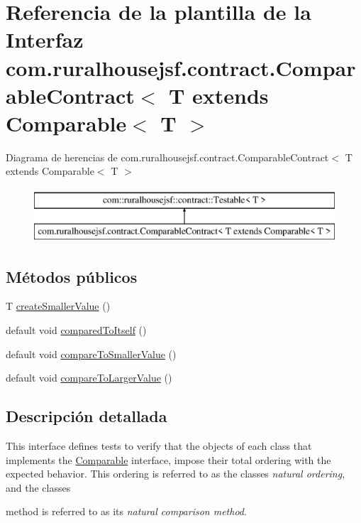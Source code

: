 \hypertarget{interfacecom_1_1ruralhousejsf_1_1contract_1_1_comparable_contract}{}\section{Referencia de la plantilla de la Interfaz com.\+ruralhousejsf.\+contract.\+Comparable\+Contract$<$ T extends Comparable$<$ T $>$}
\label{interfacecom_1_1ruralhousejsf_1_1contract_1_1_comparable_contract}
Diagrama de herencias de com.\+ruralhousejsf.\+contract.\+Comparable\+Contract$<$ T extends Comparable$<$ T $>$\begin{figure}[H]
\begin{center}
\leavevmode
\includegraphics[height=2.000000cm]{interfacecom_1_1ruralhousejsf_1_1contract_1_1_comparable_contract}
\end{center}
\end{figure}
\subsection*{Métodos públicos}
\begin{DoxyCompactItemize}
\item 
T \mbox{\hyperlink{interfacecom_1_1ruralhousejsf_1_1contract_1_1_comparable_contract_a63e1e8c46f202f132c7f15b51a11ee27}{create\+Smaller\+Value}} ()
\item 
default void \mbox{\hyperlink{interfacecom_1_1ruralhousejsf_1_1contract_1_1_comparable_contract_ad21966d20e5fffd0fa13cd021c262f11}{compared\+To\+Itself}} ()
\item 
default void \mbox{\hyperlink{interfacecom_1_1ruralhousejsf_1_1contract_1_1_comparable_contract_aa5df8ced74d7707d219de7d79eb04cb1}{compare\+To\+Smaller\+Value}} ()
\item 
default void \mbox{\hyperlink{interfacecom_1_1ruralhousejsf_1_1contract_1_1_comparable_contract_aceb2f65e9d26e521c6dc0eb2cbe6a35d}{compare\+To\+Larger\+Value}} ()
\end{DoxyCompactItemize}


\subsection{Descripción detallada}
This interface defines tests to verify that the objects of each class that implements the \mbox{\hyperlink{}{Comparable}} interface, impose their total ordering with the expected behavior. This ordering is referred to as the classes {\itshape natural ordering}, and the classes
\begin{DoxyCode}{0}
\end{DoxyCode}
 method is referred to as its {\itshape natural comparison method}. 

